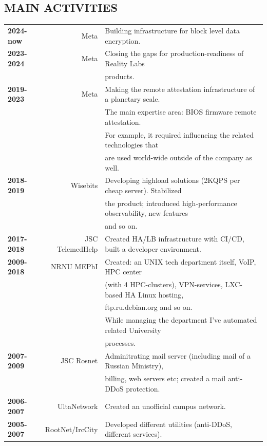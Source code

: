 \begin{resume}
\section{MAIN ACTIVITIES}
\vspace{0.1in} 
\begin{tabular}{lrl}
    {\bf 2024-now}  & Meta            & Building infrastructure for block level data encryption.\\
    {\bf 2023-2024} & Meta            & Closing the gaps for production-readiness of Reality Labs\\
                    &                 & products.\\
    {\bf 2019-2023} & Meta            & Making the remote attestation infrastructure of a planetary scale.\\
                    &                 & The main expertise area: BIOS firmware remote attestation.\\
                    &                 & For example, it required influencing the related technologies that\\
                    &                 & are used world-wide outside of the company as well.\\
    {\bf 2018-2019} & Wisebits        & Developing highload solutions (2KQPS per cheap server). Stabilized\\
                    &                 & the product; introduced high-performance observability, new features\\
                    &                 & and so on.\\
    {\bf 2017-2018} & JSC TelemedHelp & Created HA/LB infrastructure with CI/CD, built a developer environment.\\
    {\bf 2009-2018} & NRNU MEPhI      & Created: an UNIX tech department itself, VoIP, HPC center\\
                    &                 & (with 4 HPC-clusters), VPN-services, LXC-based HA Linux hosting,\\
                    &                 & ftp.ru.debian.org and so on.\\
                    &                 & While managing the department I've automated related University\\
                    &                 & processes.\\
    {\bf 2007-2009} & JSC Rosnet      & Adminitrating mail server (including mail of a Russian Ministry),\\
                    &                 & billing, web servers etc; created a mail anti-DDoS protection.\\
    {\bf 2006-2007} & UltaNetwork     & Created an unofficial campus network.\\
    {\bf 2005-2007} & RootNet/IrcCity & Developed different utilities (anti-DDoS, different services).\\
\end{tabular}
\end{resume}
